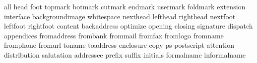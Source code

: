 \startinterface all
              {head}
              {foot}
           {topmark}
           {botmark}
           {cutmark}
           {endmark}
          {usermark}
          {foldmark}
         {extension}
         {interface}
   {backgroundimage}
        {whitespace}
          {nexthead}
          {lefthead}
         {righthead}
          {nextfoot}
          {leftfoot}
         {rightfoot}
           {content}
       {backaddress}
          {optimize}
           {opening}
           {closing}
         {signature}
          {dispatch}
        {appendices}
       {fromaddress}
          {frombank}
          {frommail}
           {fromfax}
          {fromlogo}
          {fromname}
         {fromphone}
           {fromurl}
            {toname}
         {toaddress}
         {enclosure}
              {copy}
                {ps}
        {postscript}
         {attention}
      {distribution}
        {salutation}
         {addressee}
            {prefix}
            {suffix}
          {initials}
        {formalname}
      {informalname}
